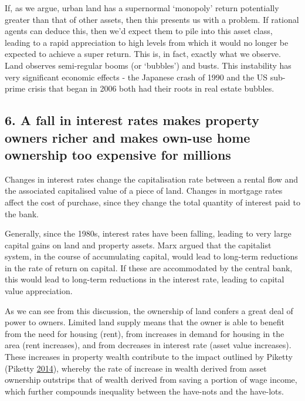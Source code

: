 \documentclass[]{tufte-handout}
\begin{document}
If, as we argue, urban land has a supernormal `monopoly' return
potentially greater than that of other assets, then this presents us
with a problem. If rational agents can deduce this, then we'd expect
them to pile into this asset class, leading to a rapid appreciation to
high levels from which it would no longer be expected to achieve a super
return. This is, in fact, exactly what we observe. Land observes
semi-regular booms (or `bubbles') and busts. This instability has very
significant economic effects - the Japanese crash of 1990 and the US
sub-prime crisis that began in 2006 both had their roots in real estate
bubbles.

\hypertarget{a-fall-in-interest-rates-makes-property-owners-richer-and-makes-own-use-home-ownership-too-expensive-for-millions}{%
\subsection{6. A fall in interest rates makes property owners richer and
makes own-use home ownership too expensive for
millions}\label{a-fall-in-interest-rates-makes-property-owners-richer-and-makes-own-use-home-ownership-too-expensive-for-millions}}

Changes in interest rates change the capitalisation rate between a
rental flow and the associated capitalised value of a piece of land.
Changes in mortgage rates affect the cost of purchase, since they change
the total quantity of interest paid to the bank.

Generally, since the 1980s, interest rates have been falling, leading to
very large capital gains on land and property assets. Marx argued that
the capitalist system, in the course of accumulating capital, would lead
to long-term reductions in the rate of return on capital. If these are
accommodated by the central bank, this would lead to long-term
reductions in the interest rate, leading to capital value appreciation.

As we can see from this discussion, the ownership of land confers a
great deal of power to owners. Limited land supply means that the owner
is able to benefit from the need for housing (rent), from increases in
demand for housing in the area (rent increases), and from decreases in
interest rate (asset value increases). These increases in property
wealth contribute to the impact outlined by Piketty (Piketty
\protect\hyperlink{ref-Piketty2014a}{2014}), whereby the rate of
increase in wealth derived from asset ownership outstrips that of wealth
derived from saving a portion of wage income, which further compounds
inequality between the have-nots and the have-lots.
\end{document}
